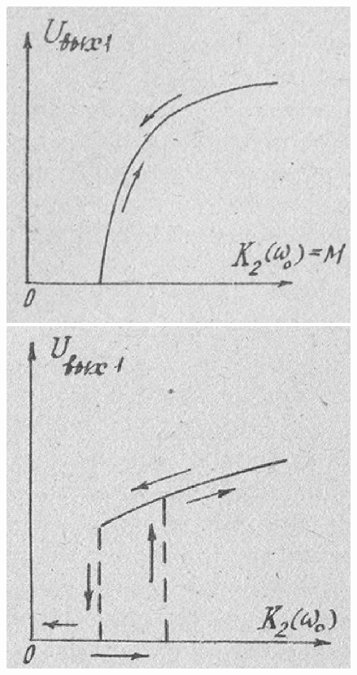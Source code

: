 \begin{figure}[h]
	\centering
	\begin{minipage}{0.49\linewidth}
	\includegraphics[width=\linewidth]{circuit/10.jpg}
	\end{minipage}
	\begin{minipage}{0.49\linewidth}
	\includegraphics[width=\linewidth]{circuit/11.jpg}
	\end{minipage}
	\caption{}
	\label{fig:figure10-11}
\end{figure}


